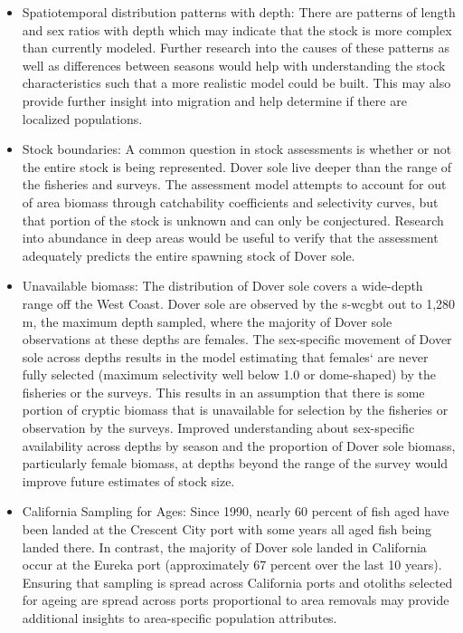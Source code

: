 \documentclass[11pt,
  english,
  a4paper,
]{article}
\begin{document}
\begin{itemize}

\item Spatiotemporal distribution patterns with depth:  There are patterns of length and sex ratios with depth which may indicate that the stock is more complex than currently modeled.  Further research into the causes of these patterns as well as differences between seasons would help with understanding the stock characteristics such that a more realistic model could be built.  This may also provide further insight into migration and help determine if there are localized populations.

\item Stock boundaries: A common question in stock assessments is whether or not the entire stock is being represented. Dover sole live deeper than the range of the fisheries and surveys.  The assessment model attempts to account for out of area biomass through catchability coefficients and selectivity curves, but that portion of the stock is unknown and can only be conjectured.  Research into abundance in deep areas would be useful to verify that the assessment adequately predicts the entire spawning stock of Dover sole.

\item Unavailable biomass: The distribution of Dover sole covers a wide-depth range off the West Coast. Dover sole are observed by the \gls{s-wcgbt} out to 1,280 m, the maximum depth sampled, where the majority of Dover sole observations at these depths are females. The sex-specific movement of Dover sole across depths results in the model estimating that females` are never fully selected (maximum selectivity well below 1.0 or dome-shaped) by the fisheries or the surveys. This results in an assumption that there is some portion of cryptic biomass that is unavailable for selection by the fisheries or observation by the surveys.  Improved understanding about sex-specific availability across depths by season and the proportion of Dover sole biomass, particularly female biomass, at depths beyond the range of the survey would improve future estimates of stock size. 

\item California Sampling for Ages: Since 1990, nearly 60 percent of fish aged have been landed at the Crescent City port with some years all aged fish being landed there. In contrast, the majority of Dover sole landed in California occur at the Eureka port (approximately 67 percent over the last 10 years). Ensuring that sampling is spread across California ports and otoliths selected for ageing are spread across ports proportional to area removals may provide additional insights to area-specific population attributes.

\end{itemize}
\end{document}
